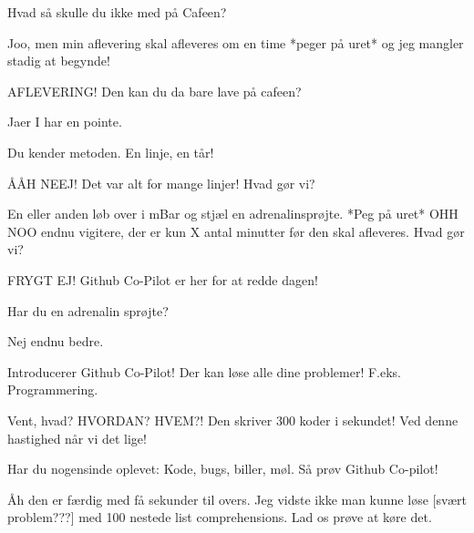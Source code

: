 \documentclass[a4paper,11pt]{article}
\begin{document}
\begin{sketch}

 Hvad så skulle du ikke med på Cafeen?

 Joo, men min aflevering skal afleveres om en time *peger på uret* og jeg mangler stadig at begynde!

 AFLEVERING! Den kan du da bare lave på cafeen?


 Jaer I har en pointe.


 Du kender metoden. En linje, en tår!


 ÅÅH NEEJ! Det var alt for mange linjer! Hvad gør vi?


 En eller anden løb over i mBar og stjæl en adrenalinsprøjte. *Peg på uret* OHH NOO endnu vigitere, der er kun X antal minutter før den skal afleveres. Hvad gør vi?


 FRYGT EJ! Github Co-Pilot er her for at redde dagen!

 Har du en adrenalin sprøjte?

 Nej endnu bedre.


 Introducerer Github Co-Pilot! Der kan løse alle dine problemer! F.eks. Programmering.

 Vent, hvad? HVORDAN? HVEM?! Den skriver 300 koder i sekundet! Ved denne hastighed når vi det lige!


 Har du nogensinde oplevet: Kode, bugs, biller, møl. Så prøv Github Co-pilot!

 Åh den er færdig med få sekunder til overs. Jeg vidste ikke man kunne løse [svært problem???] med 100 nestede list comprehensions. Lad os prøve at køre det.


\end{sketch}
\end{document}
